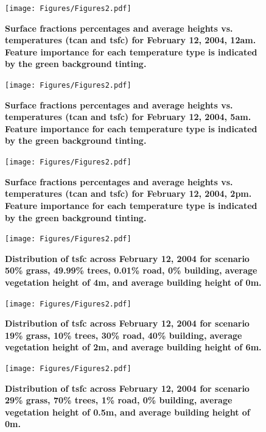\documentclass[final,3p,times,authoryear]{elsarticle}
\begin{document}
\begin{figure}
\centering
\texttt{[image: Figures/Figures2.pdf]}
\caption{\bf Surface fractions percentages and average heights vs. temperatures (\gls{tcan} and \gls{tsfc}) for February 12, 2004, 12am. Feature importance for each temperature type is indicated by the green background tinting.}
 \label{fig:box0a}
\end{figure} 

\begin{figure}
\centering
\texttt{[image: Figures/Figures2.pdf]}
\caption{\bf Surface fractions percentages and average heights vs. temperatures (\gls{tcan} and \gls{tsfc}) for February 12, 2004, 5am. Feature importance for each temperature type is indicated by the green background tinting.}
 \label{fig:box5a}
\end{figure} 

\begin{figure}
\centering
\texttt{[image: Figures/Figures2.pdf]}
\caption{\bf Surface fractions percentages and average heights vs. temperatures (\gls{tcan} and \gls{tsfc}) for February 12, 2004, 2pm. Feature importance for each temperature type is indicated by the green background tinting.}
 \label{fig:box14a}
\end{figure} 



\begin{figure}
\centering
\texttt{[image: Figures/Figures2.pdf]}
\caption{\bf Distribution of \gls{tsfc} across February 12, 2004 for scenario 50\% grass, 49.99\% trees, 0.01\% road, 0\% building, average vegetation height of 4m, and average building height of 0m.}
 \label{fig:dist}
\end{figure}


\begin{figure}
\centering
\texttt{[image: Figures/Figures2.pdf]}
\caption{\bf Distribution of \gls{tsfc} across February 12, 2004 for scenario 19\% grass, 10\% trees, 30\% road, 40\% building, average vegetation height of 2m, and average building height of 6m.}
 \label{fig:dist}
\end{figure}



\begin{figure}
\centering
\texttt{[image: Figures/Figures2.pdf]}
\caption{\bf Distribution of \gls{tsfc} across February 12, 2004 for scenario 29\% grass, 70\% trees, 1\% road, 0\% building, average vegetation height of 0.5m, and average building height of 0m.}
 \label{fig:dist}
\end{figure}
\end{document}

